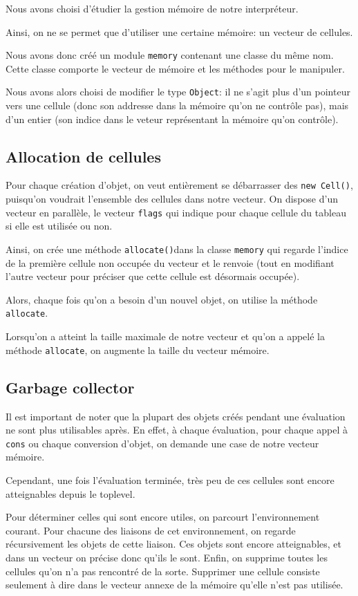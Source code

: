 \documentclass[12pt]{article}
\def\code #1{\lstinline{#1}}
\begin{document}
Nous avons choisi d'étudier la gestion mémoire de notre interpréteur.

Ainsi, on ne se permet que d'utiliser une certaine mémoire: un vecteur de cellules.

Nous avons donc créé un module \code{memory} contenant une classe du même nom. Cette classe comporte le vecteur de mémoire et les méthodes pour le manipuler.

Nous avons alors choisi de modifier le type \code{Object}: il ne s'agit plus d'un pointeur vers une cellule (donc son addresse dans la mémoire qu'on ne contrôle pas), mais d'un entier (son indice dans le veteur représentant la mémoire qu'on contrôle).

\subsection{Allocation de cellules}

Pour chaque création d'objet, on veut entièrement se débarrasser des \code{new Cell()}, puisqu'on voudrait l'ensemble des cellules dans notre vecteur.  On dispose  d'un vecteur en parallèle, le vecteur \code{flags} qui indique pour chaque cellule du tableau si elle est utilisée ou non.

Ainsi, on crée une méthode \code{allocate()}dans la classe \code{memory} qui regarde l'indice de la première cellule non occupée du vecteur et le renvoie (tout en modifiant l'autre vecteur pour préciser que cette cellule est désormais occupée).

Alors, chaque fois qu'on a besoin d'un nouvel objet, on utilise la méthode \code{allocate}.

Lorsqu'on a atteint la taille maximale de notre vecteur et qu'on a appelé la méthode \code{allocate}, on augmente la taille du vecteur mémoire.

\subsection{Garbage collector}

Il est important de noter que la plupart des objets créés pendant une évaluation ne sont plus utilisables après. En effet, à chaque évaluation, pour chaque appel à \code{cons} ou chaque conversion d'objet, on demande une case de notre vecteur mémoire.

Cependant, une fois l'évaluation terminée, très peu de ces cellules sont encore atteignables depuis le toplevel.

Pour déterminer celles qui sont encore utiles, on parcourt l'environnement courant. Pour chacune des liaisons de cet environnement, on regarde récursivement les objets de cette liaison. Ces objets sont encore atteignables, et dans un vecteur on précise donc qu'ils le sont. Enfin, on supprime toutes les cellules qu'on n'a pas rencontré de la sorte. Supprimer une cellule consiste seulement à dire dans le vecteur annexe de la mémoire qu'elle n'est pas utilisée.
\end{document}
